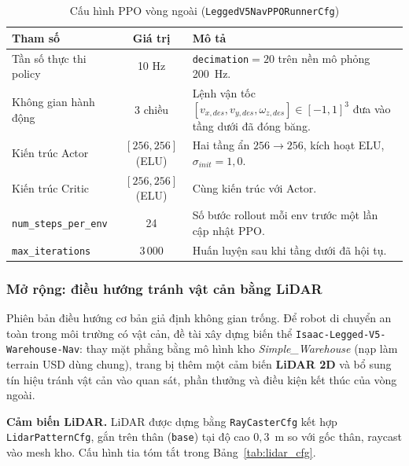 \begin{table}[H]
    \centering
    \caption{Cấu hình PPO vòng ngoài (\texttt{LeggedV5NavPPORunnerCfg})}
    \label{tab:outer_param}
    \renewcommand{\arraystretch}{1.3}
    \begin{tabular}{|p{4.0cm}|c|p{7.5cm}|}
    \hline
    \textbf{Tham số} & \textbf{Giá trị} & \textbf{Mô tả} \\
    \hline
    Tần số thực thi policy & 10 Hz &
    \texttt{decimation}${=}20$ trên nền mô phỏng 200~Hz. \\
    \hline
    Không gian hành động & 3 chiều &
    Lệnh vận tốc $[v_{x,des},v_{y,des},\omega_{z,des}]\in[-1,1]^3$ đưa vào
    tầng dưới đã đóng băng. \\
    \hline
    Kiến trúc Actor & $[256,256]$ (ELU) &
    Hai tầng ẩn $256{\to}256$, kích hoạt ELU,
    $\sigma_{init}{=}1{,}0$. \\
    \hline
    Kiến trúc Critic & $[256,256]$ (ELU) &
    Cùng kiến trúc với Actor. \\
    \hline
    \texttt{num\_steps\_per\_env} & 24 &
    Số bước rollout mỗi env trước một lần cập nhật PPO. \\
    \hline
    \texttt{max\_iterations} & 3\,000 &
    Huấn luyện sau khi tầng dưới đã hội tụ. \\
    \hline
    \end{tabular}
\end{table}

\subsubsection{Mở rộng: điều hướng tránh vật cản bằng LiDAR}
\label{sec:nav_lidar}

Phiên bản điều hướng cơ bản giả định không gian trống. Để robot di chuyển an
toàn trong môi trường có vật cản, đề tài xây dựng biến thể
\texttt{Isaac-Legged-V5-Warehouse-Nav}: thay mặt phẳng bằng mô hình kho
\textit{Simple\_Warehouse} (nạp làm terrain USD dùng chung), trang bị thêm một
cảm biến \textbf{LiDAR 2D} và bổ sung tín hiệu tránh vật cản vào quan sát,
phần thưởng và điều kiện kết thúc của vòng ngoài.

\textbf{Cảm biến LiDAR.} LiDAR được dựng bằng \texttt{RayCasterCfg} kết hợp
\texttt{LidarPatternCfg}, gắn trên thân (\texttt{base}) tại độ cao
$0{,}3$~m so với gốc thân, raycast vào mesh kho. Cấu hình tia tóm tắt trong
Bảng~\ref{tab:lidar_cfg}.

